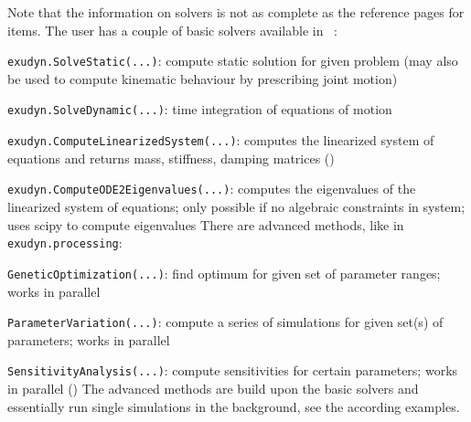 \label{sec:solvers}
Note that the information on solvers is not as complete as the reference pages for items.
The user has a couple of basic solvers available in \codeName\ :
\bi
  \item \texttt{exudyn.SolveStatic(...)}: compute static solution for given problem (may also be used to compute kinematic behaviour by prescribing joint motion)
  \item \texttt{exudyn.SolveDynamic(...)}: time integration of equations of motion
  \item \texttt{exudyn.ComputeLinearizedSystem(...)}: computes the linearized system of equations and returns mass, stiffness, damping matrices ()
  \item \texttt{exudyn.ComputeODE2Eigenvalues(...)}: computes the eigenvalues of the linearized system of equations; only possible if no algebraic constraints in system; uses scipy to compute eigenvalues
\ei
There are advanced methods, like in \texttt{exudyn.processing}:
\bi
  \item \texttt{GeneticOptimization(...)}: find optimum for given set of parameter ranges; works in parallel
  \item \texttt{ParameterVariation(...)}: compute a series of simulations for given set(s) of parameters; works in parallel
  \item \texttt{SensitivityAnalysis(...)}: compute sensitivities for certain parameters; works in parallel ()
\ei
The advanced methods are build upon the basic solvers and essentially run single simulations in the background, see the according examples.


